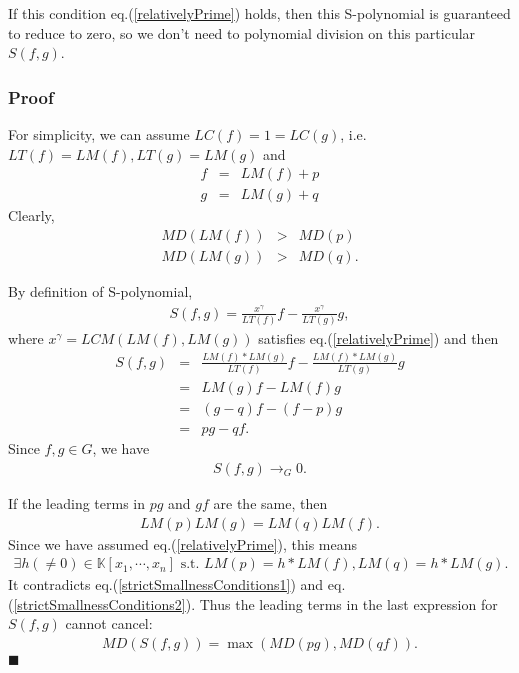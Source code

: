 \documentclass[11pt]{book}
\begin{document}
If this condition eq.(\ref{relativelyPrime}) holds, then this S-polynomial is guaranteed to reduce to zero, so we don't need to polynomial division on this particular $S(f,g)$.

\subsubsection{Proof}
For simplicity, we can assume $LC(f) = 1 = LC(g)$, i.e. $LT(f) = LM(f), LT(g) = LM(g)$ and
\begin{eqnarray}
f &=& LM(f) + p \\
g &=& LM(g) + q
\end{eqnarray}
Clearly,
\begin{eqnarray}
\label{strictSmallnessConditions1}
MD\left( LM(f) \right) &>& MD(p) \\
\label{strictSmallnessConditions2}
MD\left( LM(g) \right) &>& MD(q).
\end{eqnarray}

By definition of S-polynomial,
\begin{eqnarray}
S(f,g) = \frac{x^\gamma}{LT(f)} f - \frac{x^\gamma}{LT(g)} g ,
\end{eqnarray}
where $x^\gamma = LCM( LM(f), LM(g))$ satisfies eq.(\ref{relativelyPrime}) and then
\begin{eqnarray}
S(f,g) &=& \frac{LM(f) * LM(g)}{LT(f)} f - \frac{LM(f) * LM(g)}{LT(g)} g \\
&=& LM(g) f - LM(f) g \\
&=& (g-q)f - (f-p)g \\
&=& pg - qf.
\end{eqnarray}
Since $f,g \in G$, we have
\begin{eqnarray}
S(f,g) \to_G 0.
\end{eqnarray}

If the leading terms in $pg$ and $gf$ are the same, then
\begin{eqnarray}
LM(p)LM(g) = LM(q)LM(f).
\end{eqnarray}
Since we have assumed eq.(\ref{relativelyPrime}), this means
\begin{eqnarray}
\exists h (\neq 0) \in \mathbb{K}[x_1, \cdots, x_n] \text{ s.t. } LM(p) = h*LM(f), LM(q) = h* LM(g).  \qquad
\end{eqnarray}
It contradicts eq.(\ref{strictSmallnessConditions1}) and eq.(\ref{strictSmallnessConditions2}).
Thus the leading terms in the last expression for $S(f,g)$ cannot cancel:
\begin{eqnarray}
MD\left(S(f,g) \right) = \max\left( MD(pg), MD(qf) \right).
\end{eqnarray}
$\blacksquare$
\end{document}
